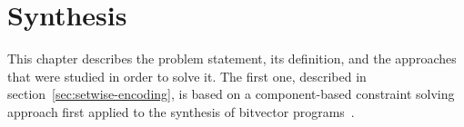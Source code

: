 \chapter{Synthesis}
\label{chap:synthesis}

This chapter describes the problem statement, its definition, and the approaches
that were studied in order to solve it. The first one, described in
section~\ref{sec:setwise-encoding}, is based on a component-based constraint
solving approach first applied to the synthesis of bitvector
programs~\cite{Gulwani:2011:SLP, Jha:oracle:2010}.




